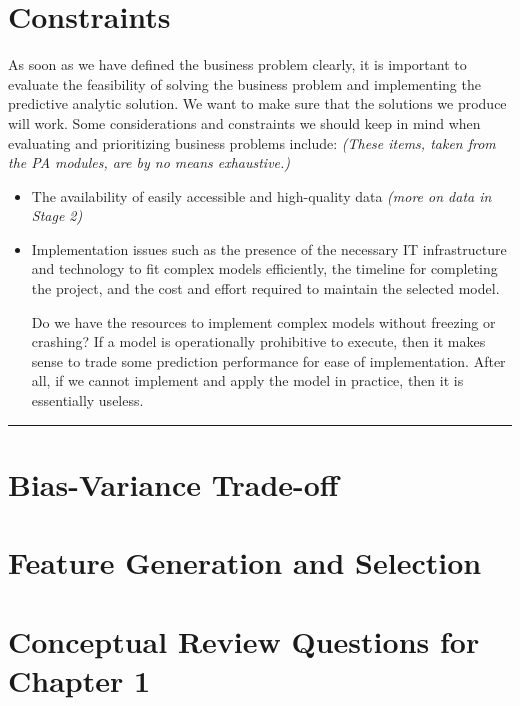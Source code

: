 \documentclass[
  12pt,
]{krantz}
\begin{document}
\section{Constraints}\label{constraints}

As soon as we have defined the business problem clearly, it is important to
evaluate the feasibility of solving the business problem and implementing the
predictive analytic solution. We want to make sure that the solutions we produce
will work. Some considerations and constraints we should keep in mind when
evaluating and prioritizing business problems include: \emph{(These items, taken from
the PA modules, are by no means exhaustive.)}

\begin{itemize}
\item
  The availability of easily accessible and high-quality data \emph{(more on data
  in Stage 2)}
\item
  Implementation issues such as the presence of the necessary IT
  infrastructure and technology to fit complex models efficiently, the
  timeline for completing the project, and the cost and effort required to
  maintain the selected model.

  Do we have the resources to implement complex models without freezing or
  crashing? If a model is operationally prohibitive to execute, then it makes
  sense to trade some prediction performance for ease of implementation. After
  all, if we cannot implement and apply the model in practice, then it is
  essentially useless.
\end{itemize}

\begin{center}\rule{0.5\linewidth}{0.5pt}\end{center}

\section{Bias-Variance Trade-off}\label{bias-variance-trade-off}

\section{Feature Generation and Selection}\label{feature-generation-and-selection}

\section{Conceptual Review Questions for Chapter 1}\label{conceptual-review-questions-for-chapter-1}

  

\backmatter
\printindex
\end{document}
